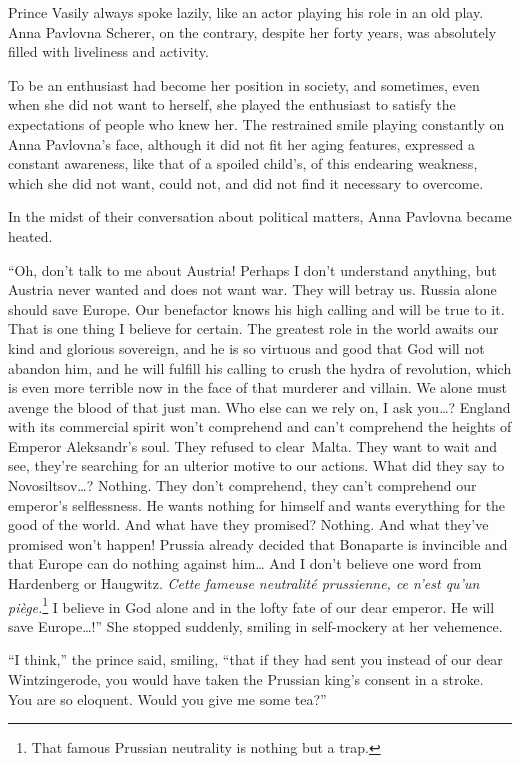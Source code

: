 Prince Vasily always spoke lazily, like an actor playing his role in
an old play. Anna Pavlovna Scherer, on the contrary, despite her forty
years, was absolutely filled with liveliness and activity.

To be an enthusiast had become her position in society, and sometimes,
even when she did not want to herself, she played the enthusiast to
satisfy the expectations of people who knew her. The restrained smile
playing constantly on Anna Pavlovna's face, although it did not fit
her aging features, expressed a constant awareness, like that of a
spoiled child's, of this endearing weakness, which she did not want,
could not, and did not find it necessary to overcome.

In the midst of their conversation about political matters, Anna
Pavlovna became heated.

``Oh, don't talk to me about Austria! Perhaps I don't understand
anything, but Austria never wanted and does not want war. They will
betray us. Russia alone should save Europe. Our benefactor knows his
high calling and will be true to it. That is one thing I believe for
certain. The greatest role in the world awaits our kind and glorious
sovereign, and he is so virtuous and good that God will not abandon
him, and he will fulfill his calling to crush the hydra of revolution,
which is even more terrible now in the face of that murderer and
villain. We alone must avenge the blood of that just man. Who else can
we rely on, I ask you\ldots{}? England with its commercial spirit
won't comprehend and can't comprehend the heights of Emperor
Aleksandr's soul. They refused to clear\ Malta. They want to
wait and see, they're searching for an ulterior motive to our
actions. What did they say to Novosiltsov\ldots{}?  Nothing. They
don't comprehend, they can't comprehend our emperor's selflessness. He
wants nothing for himself and wants everything for the good of the
world. And what have they promised? Nothing. And what they've promised
won't happen! Prussia already decided that Bonaparte is invincible and
that Europe can do nothing against him\ldots{} And I don't believe one
word from Hardenberg or Haugwitz. \textit{Cette fameuse neutralit\'e
  prussienne, ce n'est qu'un pi\`ege.}\footnote{That famous Prussian
  neutrality is nothing but a trap.} I believe in God alone and in the
lofty fate of our dear emperor. He will save Europe\ldots{}!'' She
stopped suddenly, smiling in self-mockery at her vehemence.

``I think,'' the prince said, smiling, ``that if they had sent you
instead of our dear Wintzingerode, you would have taken the Prussian
king's consent in a stroke. You are so eloquent. Would you give me
some tea?''

